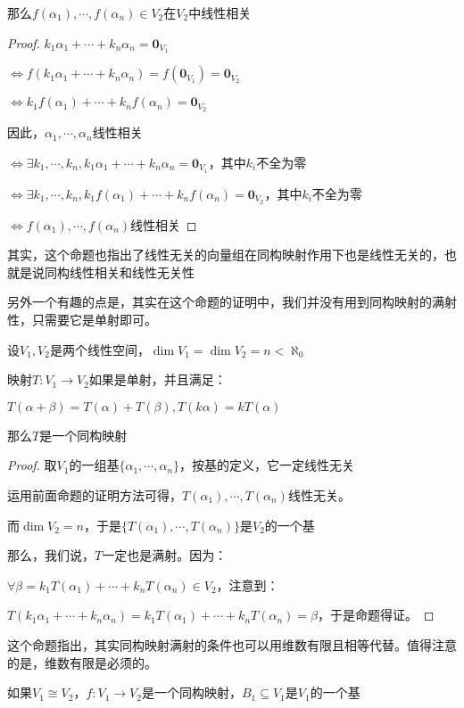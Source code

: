 \documentclass[12pt, a4paper, oneside, UTF8]{ctexbook}
\begin{document}
\begin{para}{0}
\begin{proposition}
						那么$f(\alpha_1),\cdots,f(\alpha_n) \in V_2$在$V_2$中线性相关
					\end{proposition}
					\begin{proof}
						$k_1 \alpha_1 + \cdots + k_n \alpha_n = \mathbf{0}_{V_1}$

						$\Leftrightarrow f(k_1 \alpha_1 + \cdots + k_n \alpha_n) = f(\mathbf{0}_{V_1})=\mathbf{0}_{V_2}$

						$\Leftrightarrow k_1f(\alpha_1) + \cdots + k_nf(\alpha_n) = \mathbf{0}_{V_2}$

						因此，$\alpha_1,\cdots,\alpha_n$线性相关

						$\Leftrightarrow \exists k_1,\cdots,k_n,k_1 \alpha_1 + \cdots + k_n \alpha_n = \mathbf{0}_{V_1}$，其中$k_i$不全为零

						$\Leftrightarrow \exists k_1,\cdots,k_n,k_1 f(\alpha_1) + \cdots + k_n f(\alpha_n) = \mathbf{0}_{V_2}$，其中$k_i$不全为零
					
						$\Leftrightarrow f(\alpha_1),\cdots,f(\alpha_n)$线性相关
					\end{proof}
					其实，这个命题也指出了线性无关的向量组在同构映射作用下也是线性无关的，也就是说同构线性相关和线性无关性
				
					另外一个有趣的点是，其实在这个命题的证明中，我们并没有用到同构映射的满射性，只需要它是单射即可。
				\point{}
					\begin{proposition}
						设$V_1,V_2$是两个线性空间，$\dim V_1  = \dim V_2 = n < \aleph_0$

						映射$T:V_1 \to V_2$如果是单射，并且满足：
						
						$T(\alpha +\beta )=T(\alpha )+T(\beta ),T(k\alpha )=kT(\alpha )$

						那么$T$是一个同构映射
					\end{proposition}
					\begin{proof}
						取$V_1$的一组基$\{\alpha_1,\cdots,\alpha_n\}$，按基的定义，它一定线性无关

						运用前面命题的证明方法可得，$T(\alpha_1),\cdots,T(\alpha_n)$线性无关。

						而$\dim V_2 = n$，于是$\{T(\alpha_1),\cdots,T(\alpha_n)\}$是$V_2$的一个基

						那么，我们说，$T$一定也是满射。因为：

						$\forall \beta = k_1 T(\alpha_1)+\cdots+k_n T(\alpha_n) \in V_2$，注意到：

						$T(k_1 \alpha_1+\cdots+k_n \alpha_n) = k_1 T(\alpha_1)+\cdots+k_n T(\alpha_n) =\beta $，于是命题得证。
					\end{proof}
					这个命题指出，其实同构映射满射的条件也可以用维数有限且相等代替。值得注意的是，维数有限是必须的。
				\point{}
					\begin{proposition}
						如果$V_1 \cong V_2$，$f:V_1 \to V_2$是一个同构映射，$B_1 \subseteq V_1$是$V_1$的一个基


\end{proposition}
\end{para}
\end{document}

